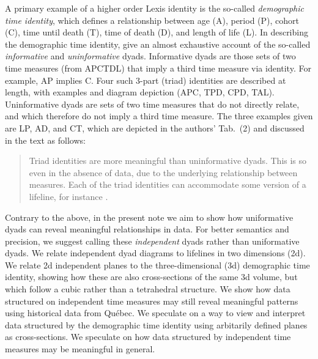 A primary example of a higher order Lexis identity is the so-called \emph{demographic time identity}, which defines a relationship between age (A), period (P), cohort (C), time until death (T), time of death (D), and length of life (L). In describing the demographic time identity, \citet{riffe2017demographictime} give an almost exhaustive account of the so-called \emph{informative} and \emph{uninformative} dyads. Informative dyads are those sets of two time measures (from APCTDL) that imply a third time measure via identity. For example, AP implies C. Four such 3-part (triad) identities are described at length, with examples and diagram depiction (APC, TPD, CPD, TAL). Uninformative dyads are sets of two time measures that do not directly relate, and which therefore do not imply a third time measure. The three examples given are LP, AD, and CT, which are depicted in the authors' Tab.~(2) and discussed in the text as follows:
\begin{quote}
Triad identities are more meaningful than uninformative dyads. This is so even in the absence of data, due to the underlying relationship between measures. Each of the triad identities can accommodate some version of a lifeline, for instance \citep[p5][]{riffe2017demographictime}. 
\end{quote}

Contrary to the above, in the present note we aim to show how uniformative dyads can reveal meaningful relationships in data. For better semantics and precision, we suggest calling these \emph{independent} dyads rather than uniformative dyads. We relate independent dyad diagrams to lifelines in two dimensions (2d). We relate 2d independent planes to the three-dimensional (3d) demographic time identity, showing how these are also cross-sections of the same 3d volume, but which follow a cubic rather than a tetrahedral structure. We show how data structured on independent time measures may still reveal meaningful patterns using historical data from Qu\'{e}bec. We speculate on a way to view and interpret data structured by the demographic time identity using arbitarily defined planes as cross-sections. We speculate on how data structured by independent time measures may be meaningful in general.



